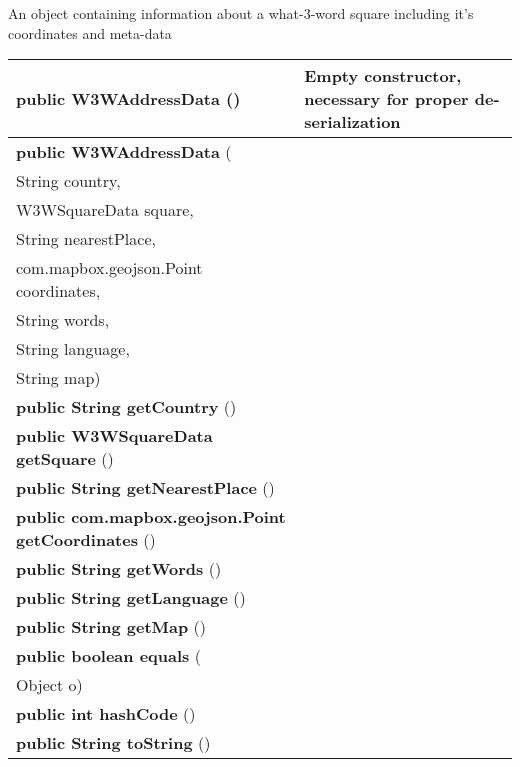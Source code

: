  { An object containing information about a what{-}3{-}word square including it's coordinates and meta{-}data
 
\begin{tabular}{ p{3in}|m{3.4in}}
\textbf{public W3WAddressData} () & Empty constructor, necessary for proper de{-}serialization\\ \hline 
\textbf{public W3WAddressData } (\\ \hspace*{ 5pt} String country,\\\hspace*{ 5pt} W3WSquareData square,\\\hspace*{ 5pt} String nearestPlace,\\\hspace*{ 5pt} com.mapbox.geojson.Point coordinates,\\\hspace*{ 5pt} String words,\\\hspace*{ 5pt} String language,\\\hspace*{ 5pt} String map) & \\ \hline 
\textbf{public String getCountry} () & \\ \hline 
\textbf{public W3WSquareData getSquare} () & \\ \hline 
\textbf{public String getNearestPlace} () & \\ \hline 
\textbf{public com.mapbox.geojson.Point getCoordinates} () & \\ \hline 
\textbf{public String getWords} () & \\ \hline 
\textbf{public String getLanguage} () & \\ \hline 
\textbf{public String getMap} () & \\ \hline 
\textbf{public boolean equals } (\\ \hspace*{ 5pt} Object o) & \\ \hline 
\textbf{public int hashCode} () & \\ \hline 
\textbf{public String toString} () & \\ \hline 
\end{tabular}
}
